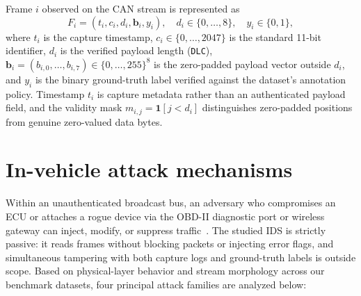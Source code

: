 \documentclass[12pt, a4paper, reqno, oneside]{book}
\DeclareRobustCommand{\code}[1]{\nolinkurl{#1}}
\begin{document}
Frame $i$ observed on the CAN stream is represented as
\begin{equation}\label{eq:can-frame}
F_i=(t_i,c_i,d_i,\mathbf{b}_i,y_i),\quad d_i\in\{0,\ldots,8\},\quad y_i\in\{0,1\},
\end{equation}
where $t_i$ is the capture timestamp, $c_i \in \{0,\ldots,2047\}$ is the standard 11-bit identifier, $d_i$ is the verified payload length (\code{DLC}), $\mathbf{b}_i=(b_{i,0},\ldots,b_{i,7}) \in \{0,\ldots,255\}^8$ is the zero-padded payload vector outside $d_i$, and $y_i$ is the binary ground-truth label verified against the dataset's annotation policy. Timestamp $t_i$ is capture metadata rather than an authenticated payload field, and the validity mask $m_{i,j} = \mathbf{1}[j < d_i]$ distinguishes zero-padded positions from genuine zero-valued data bytes.

\section{In-vehicle attack mechanisms}
Within an unauthenticated broadcast bus, an adversary who compromises an ECU or attaches a rogue device via the OBD-II diagnostic port or wireless gateway can inject, modify, or suppress traffic~\cite{koscher2010experimental,checkoway2011comprehensive}. The studied IDS is strictly passive: it reads frames without blocking packets or injecting error flags, and simultaneous tampering with both capture logs and ground-truth labels is outside scope. Based on physical-layer behavior and stream morphology across our benchmark datasets, four principal attack families are analyzed below:
\end{document}
